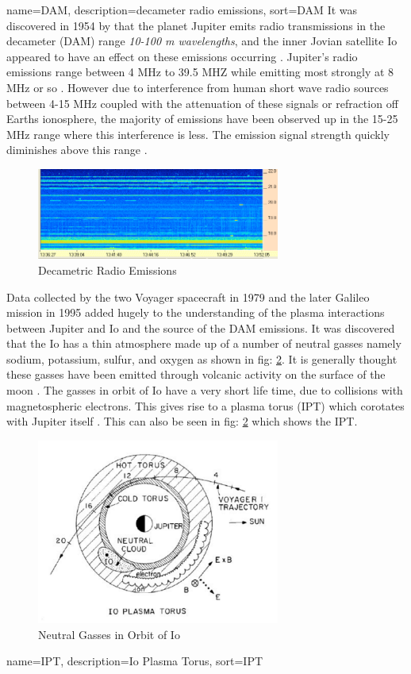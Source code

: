 \documentclass[runningheads,a4paper]{llncs}
\begin{document}
{
  name={DAM},
  description={decameter radio emissions},
  sort=DAM
}
%
It was discovered in 1954 by \cite{burke55} that the planet Jupiter emits radio transmissions in the decameter (\gls{DAM}) range \textit{10-100 m wavelengths}, and the inner Jovian satellite Io appeared to have an effect on these emissions occurring \citep{belcher87}. Jupiter's radio emissions range between 4 MHz to 39.5 MHZ while emitting most strongly at 8 MHz or so \citep{wilkinson94}. However due to interference from human short wave radio sources between 4-15 MHz coupled with the attenuation of these signals or refraction off Earths ionosphere, the majority of emissions have been observed up in the 15-25 MHz range where this interference is less. The emission signal strength quickly diminishes above this range \citep{wilkinson94}.
%
\begin{figure}[here]
\centering
\includegraphics[width=8cm]{images/01}
\caption{Decametric Radio Emissions \citep{ashcraft13}}
\label{fig:dam_Emissions}
\end{figure}
%

Data collected by the two Voyager spacecraft in 1979 \citep{belcher87} and the later Galileo mission in 1995 \citep{kivelson96} added hugely to the understanding of the plasma interactions between Jupiter and Io and the source of the \gls{DAM} emissions. It was discovered that the Io has a thin atmosphere made up of a number of neutral gasses namely sodium, potassium, sulfur, and oxygen as shown in fig: \ref{fig:io_neutral_gasses}. It is generally thought these gasses have been emitted through volcanic activity on the surface of the moon \citep{belcher87}. The gasses in orbit of Io have a very short life time, due to collisions with magnetospheric electrons. This gives rise to a plasma torus (\gls{IPT}) which corotates with Jupiter itself \citep{belcher87}. This can also be seen in fig: \ref{fig:io_neutral_gasses} which shows the \gls{IPT}.
%
\begin{figure}[here]
\centering
\includegraphics[width=8cm]{images/02}
\caption{Neutral Gasses in Orbit of Io \citep{belcher87}}
\label{fig:io_neutral_gasses}
\end{figure}
%
{
  name={IPT},
  description={Io Plasma Torus},
  sort=IPT
}
%
\end{document}
